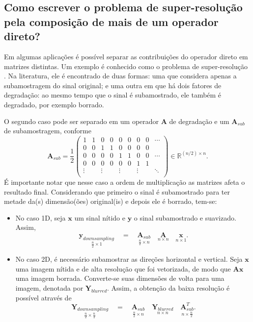\subsection{Como escrever o problema de super-resolução pela composição de mais de um operador direto?}
Em algumas aplicações é possível separar as contribuições do operador direto em matrizes distintas. Um exemplo é conhecido como o problema de super-resolução \cite[Subseções 3.9.6.3 e 3.13.7]{bovik2005handbook}. Na literatura, ele é encontrado de duas formas: uma que considera apenas a subamostragem do sinal original; e uma outra em que há dois fatores de degradação: ao mesmo tempo que o sinal é subamostrado, ele também é degradado, por exemplo borrado.

 O segundo caso pode ser separado em um operador $\mathbf{A}$ de degradação e um $\mathbf{A}_{sub}$ de subamostragem, conforme
\begin{equation}
\mathbf{A}_{sub} = \frac{1}{2}\begin{pmatrix}
1 & 1 & 0 & 0 & 0 & 0 & 0 & 0 &  \cdots\\
0 & 0 & 1 & 1 & 0 & 0 & 0 & 0 & \\
0 & 0 & 0 & 0 & 1 & 1 & 0 & 0 & \cdots\\
0 & 0 & 0 & 0 & 0 & 0 & 1 & 1 & \\
\vdots & & \vdots &  & \vdots &  & \vdots & & \ddots\\
\end{pmatrix} \in \mathbb{R}^{(n/2) \times n}.
 \label{eq:downs} 
\end{equation}
É importante notar que  nesse caso a ordem de multiplicação as matrizes afeta o resultado final. Considerando que primeiro o sinal é subamostrado para ter metade da(s) dimensão(ões) original(is) e depois ele é borrado, tem-se: 
\begin{itemize}
\item No caso 1D, seja $\mathbf{x}$ um sinal nítido e $\mathbf{y}$ o sinal subamostrado e suavizado. Assim,
\begin{equation}
\underset{\frac{n}{2} \times 1}{\mathbf{y}_{downsampling}} \quad = \quad \underset{\frac{n}{2} \times n}{\mathbf{A}_{sub}} \quad \underset{n \times n}{\mathbf{A}} \quad \underset{n \times 1}{\mathbf{x}}. 
\label{eq:super1}
\end{equation}
\item No caso 2D, é necessário subamostrar as direções horizontal e vertical. Seja $\mathbf{x}$ uma imagem nítida e de alta resolução que foi vetorizada, de modo que $\mathbf{A}\mathbf{x}$  uma imagem borrada. Converte-se suas dimensões de volta para uma imagem, denotada por $\mathbf{Y}_{blurred}$. Assim, a obtenção da baixa resolução é possível através de 
\begin{equation}
\underset{\frac{n}{2} \times \frac{n}{2}}{\mathbf{Y}_{downsampling}} \quad = \quad \underset{\frac{n}{2} \times n}{\mathbf{A}_{sub}} \quad \underset{n \times n}{\mathbf{Y}_{blurred}}\quad  \underset{n \times \frac{n}{2}}{\mathbf{A}_{sub}^T}. 
\label{eq:super2}
\end{equation}
\end{itemize}


